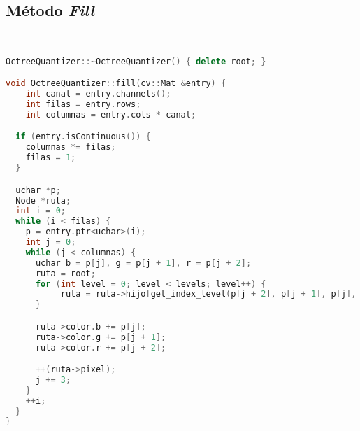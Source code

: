 \subsection{Método \textit{Fill}}
\\
\begin{lstlisting}[language=C++,
                   directivestyle={\color{black}}
                   emph={int,char,double,float,unsigned},
                   emphstyle={\color{blue}}
                  ]
OctreeQuantizer::~OctreeQuantizer() { delete root; }

void OctreeQuantizer::fill(cv::Mat &entry) {
    int canal = entry.channels();
    int filas = entry.rows;
    int columnas = entry.cols * canal;

  if (entry.isContinuous()) {
    columnas *= filas;
    filas = 1;
  }

  uchar *p;
  Node *ruta;
  int i = 0;
  while (i < filas) {
    p = entry.ptr<uchar>(i);
    int j = 0;
    while (j < columnas) {
      uchar b = p[j], g = p[j + 1], r = p[j + 2];
      ruta = root;
      for (int level = 0; level < levels; level++) {
           ruta = ruta->hijo[get_index_level(p[j + 2], p[j + 1], p[j], level)];
      }

      ruta->color.b += p[j];
      ruta->color.g += p[j + 1];
      ruta->color.r += p[j + 2];

      ++(ruta->pixel);
      j += 3;
    }
    ++i;
  }
}
\end{lstlisting}